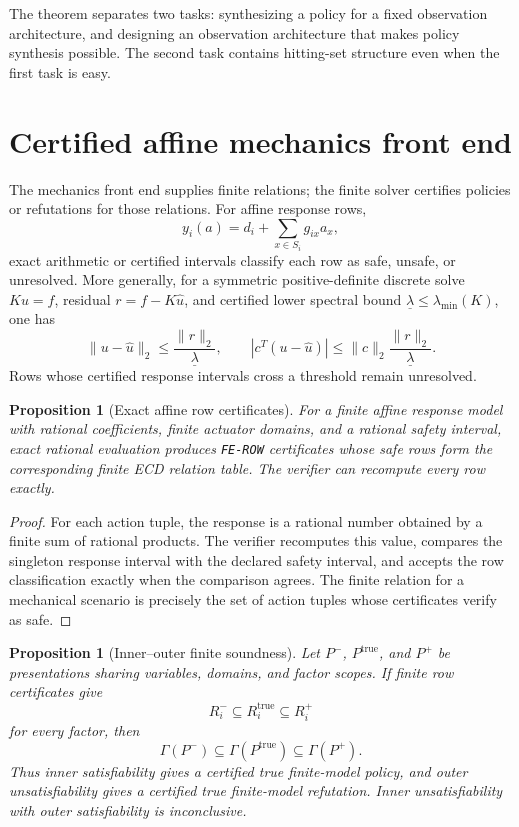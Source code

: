 \documentclass[11pt]{article}
\theoremstyle{plain}
\newtheorem{proposition}[theorem]{Proposition}
\theoremstyle{definition}
\theoremstyle{remark}
\begin{document}
The theorem separates two tasks: synthesizing a policy for a fixed observation
architecture, and designing an observation architecture that makes policy
synthesis possible.  The second task contains hitting-set structure even when
the first task is easy.

\section{Certified affine mechanics front end}
\label{sec:mechanics-front-end}

The mechanics front end supplies finite relations; the finite solver certifies
policies or refutations for those relations.  For affine response rows,
\[
  y_i(a)=d_i+\sum_{x\in S_i}g_{ix}a_x,
\]
exact arithmetic or certified intervals classify each row as safe, unsafe, or
unresolved.  More generally, for a symmetric positive-definite discrete solve
\(Ku=f\), residual \(r=f-K\widehat u\), and certified lower spectral bound
\(\underline\lambda\le\lambda_{
\min}(K)\), one has
\[
  \|u-\widehat u\|_2\le \frac{\|r\|_2}{\underline\lambda},
  \qquad
  |c^T(u-\widehat u)|\le
  \|c\|_2\frac{\|r\|_2}{\underline\lambda}.
\]
Rows whose certified response intervals cross a threshold remain unresolved.

\begin{proposition}[Exact affine row certificates]
\label{prop:exact-affine-row-certificates}
For a finite affine response model with rational coefficients, finite actuator
domains, and a rational safety interval, exact rational evaluation produces
\texttt{FE-ROW} certificates whose safe rows form the corresponding finite ECD
relation table.  The verifier can recompute every row exactly.
\end{proposition}

\begin{proof}
For each action tuple, the response is a rational number obtained by a finite
sum of rational products.  The verifier recomputes this value, compares the
singleton response interval with the declared safety interval, and accepts the
row classification exactly when the comparison agrees.  The finite relation for
a mechanical scenario is precisely the set of action tuples whose certificates
verify as safe.
\end{proof}

\begin{proposition}[Inner--outer finite soundness]
\label{prop:inner-outer-soundness}
Let \(P^-\), \(P^{\mathrm{true}}\), and \(P^+\) be presentations sharing
variables, domains, and factor scopes.  If finite row certificates give
\[
  R_i^-\subseteq R_i^{\mathrm{true}}\subseteq R_i^+
\]
for every factor, then
\[
  \Gamma(P^-)\subseteq\Gamma(P^{\mathrm{true}})\subseteq\Gamma(P^+).
\]
Thus inner satisfiability gives a certified true finite-model policy, and outer
unsatisfiability gives a certified true finite-model refutation.  Inner
unsatisfiability with outer satisfiability is inconclusive.
\end{proposition}
\end{document}
